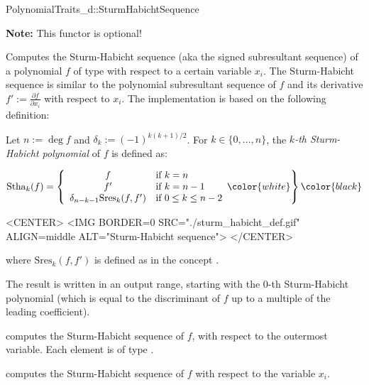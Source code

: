 \begin{ccRefConcept}{PolynomialTraits_d::SturmHabichtSequence}

\textbf{Note:} This functor is optional!

\ccDefinition

Computes the Sturm-Habicht sequence 
(aka the signed subresultant sequence)
of a polynomial $f$ of type 
 with respect to a certain variable $x_i$.
The Sturm-Habicht sequence is similar to the polynomial subresultant sequence
of $f$ and its derivative $f':=\frac{\partial f}{\partial x_i}$
with respect to $x_i$. The implementation is based on the following definition:

Let $n:=\deg f$ and $\delta_k:=(-1)^{k(k+1)/2}$. 
For $k\in\{0,\ldots,n\}$, the {\it $k$-th Sturm-Habicht polynomial} 
of $f$ is defined as:

\begin{ccTexOnly}
$$\mathrm{Stha}_k(f)=\left\{\begin{array}{cl}
f & \textrm{if\ } k=n\\
f' & \textrm{if\ } k=n-1\\
\delta_{n-k-1}\mathrm{Sres}_k(f,f') &\textrm{if\ } 0\leq k\leq n-2
\end{array}\color{white}\right\}\color{black}$$
\end{ccTexOnly}

\begin{ccHtmlOnly}
<CENTER>
<IMG BORDER=0 SRC="./sturm_habicht_def.gif" ALIGN=middle ALT="Sturm-Habicht sequence">
</CENTER>
\end{ccHtmlOnly}

where $\mathrm{Sres}_k(f,f')$ is defined 
as in the concept .

The result is written in an output range, 
starting with the $0$-th Sturm-Habicht polynomial (which is equal to
the discriminant of $f$ up to a multiple of the leading coefficient).

\ccOperations
{}
         { computes the Sturm-Habicht sequence of $f$, 
           with respect to the outermost variable. Each element is of type
           .}

         { computes the Sturm-Habicht sequence of $f$ 
           with respect to the variable $x_i$.}


\ccSeeAlso

\\
\\

\end{ccRefConcept}
